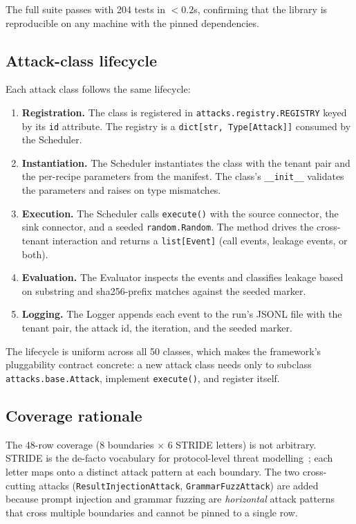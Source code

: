 The full suite passes with 204 tests in $< 0.2$s, confirming
that the library is reproducible on any machine with the pinned
dependencies.

\subsection{Attack-class lifecycle}

Each attack class follows the same lifecycle:

\begin{enumerate}
  \item \textbf{Registration.} The class is registered in
        \texttt{attacks.registry.REGISTRY} keyed by its
        \texttt{id} attribute. The registry is a
        \texttt{dict[str, Type[Attack]]} consumed by the
        Scheduler.
  \item \textbf{Instantiation.} The Scheduler instantiates the
        class with the tenant pair and the per-recipe
        parameters from the manifest. The class's
        \texttt{\_\_init\_\_} validates the parameters and
        raises on type mismatches.
  \item \textbf{Execution.} The Scheduler calls
        \texttt{execute()} with the source connector, the
        sink connector, and a seeded \texttt{random.Random}.
        The method drives the cross-tenant interaction and
        returns a \texttt{list[Event]} (call events,
        leakage events, or both).
  \item \textbf{Evaluation.} The Evaluator inspects the
        events and classifies leakage based on substring
        and sha256-prefix matches against the seeded
        marker.
  \item \textbf{Logging.} The Logger appends each event to
        the run's JSONL file with the tenant pair, the
        attack id, the iteration, and the seeded marker.
\end{enumerate}

The lifecycle is uniform across all 50 classes, which makes
the framework's pluggability contract concrete: a new attack
class needs only to subclass \texttt{attacks.base.Attack},
implement \texttt{execute()}, and register itself.

\subsection{Coverage rationale}

The 48-row coverage (8 boundaries $\times$ 6 STRIDE letters)
is not arbitrary. STRIDE is the de-facto vocabulary for
protocol-level threat modelling~\cite{stride_orig}; each
letter maps onto a distinct attack pattern at each
boundary. The two cross-cutting attacks
(\texttt{ResultInjectionAttack}, \texttt{GrammarFuzzAttack})
are added because prompt injection and grammar fuzzing are
\emph{horizontal} attack patterns that cross multiple
boundaries and cannot be pinned to a single row.

